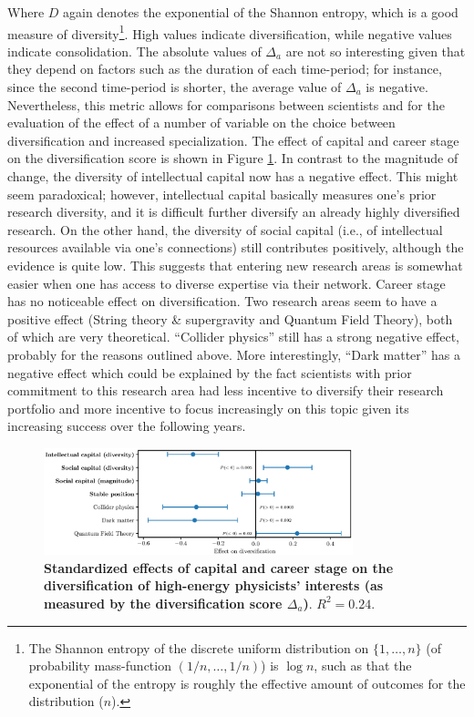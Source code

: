 \documentclass{article}
\begin{document}
Where $D$ again denotes the exponential of the Shannon entropy, which is a good measure of diversity\footnote{The Shannon entropy of the discrete uniform distribution on $\{1,\dots,n\}$ (of probability mass-function $(1/n,\dots,1/n)$) is $\log{n}$, such as that the exponential of the entropy is roughly the effective amount of outcomes for the distribution ($n$).}. High values indicate diversification, while negative values indicate consolidation. The absolute values of $\Delta_a$ are not so interesting given that they depend on factors such as the duration of each time-period; for instance, since the second time-period is shorter, the average value of $\Delta_a$ is negative. Nevertheless, this metric allows for comparisons between scientists and for the evaluation of the effect of a number of variable on the choice between diversification and increased specialization. The effect of capital and career stage on the diversification score is shown in Figure \ref{fig:diversification_score_effect}. In contrast to the magnitude of change, the diversity of intellectual capital now has a negative effect. This might seem paradoxical; however, intellectual capital basically measures one's prior research diversity, and it is difficult further diversify an already highly diversified research. On the other hand, the diversity of social capital (i.e., of intellectual resources available via one's connections) still contributes positively, although the evidence is quite low. This suggests that entering new research areas is somewhat easier when one has access to diverse expertise via their network. Career stage has no  noticeable effect on diversification. Two research areas seem to have a positive effect (String theory \& supergravity and Quantum Field Theory), both of which are very theoretical. ``Collider physics'' still has a strong negative effect, probably for the reasons outlined above. More interestingly, ``Dark matter'' has a negative effect which could be explained by the fact scientists with prior commitment to this research area had less incentive to diversify their research portfolio and more incentive to focus increasingly on this topic given its increasing success over the following  years.
 
\begin{figure}
    \centering
    \includegraphics[width=0.8\textwidth]{plots/diversification_score_effects.eps}
    \caption{\textbf{Standardized effects of capital and career stage on the diversification of high-energy physicists' interests (as measured by the diversification score $\Delta_a$)}. $R^2=0.24$.}
    \label{fig:diversification_score_effect}
\end{figure}
\end{document}
